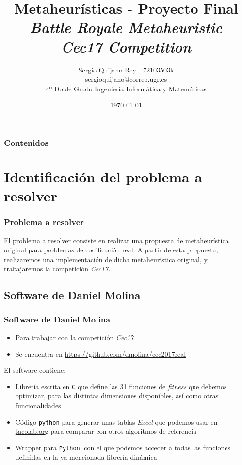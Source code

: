 \documentclass{beamer}
\title{
    {Metaheurísticas - Proyecto Final}\\
    {\emph{Battle Royale Metaheuristic}}\\
    {\emph{Cec17 Competition}}
}
\author{
    {Sergio Quijano Rey - 72103503k}\\
    {sergioquijano@correo.ugr.es} \\
    {4º Doble Grado Ingeniería Informática y Matemáticas}
}
\date{\today}
\begin{document}
\begin{frame}
    \titlepage
\end{frame}

\begin{frame}
    \frametitle{Contenidos}
    \tableofcontents
\end{frame}

\section{Identificación del problema a resolver}

\begin{frame}
\frametitle{Problema a resolver}

El problema a resolver consiste en realizar una propuesta de metaheurística original para problemas de codificación real. A partir de esta propuesta, realizaremos una implementación de dicha metaheurística original, y trabajaremos la competición \emph{Cec17}.

\end{frame}

\subsection{Software de Daniel Molina}
\begin{frame}
\frametitle{Software de Daniel Molina}
    \begin{itemize}
        \item Para trabajar con la competición \emph{Cec17}
        \item Se encuentra en \url{https://github.com/dmolina/cec2017real}
    \end{itemize}
\end{frame}

\begin{frame}
El software contiene:

\begin{itemize}
    \item Librería escrita en \lstinline{C} que define las 31 funciones de \emph{fitness} que debemos optimizar, para las distintas dimensiones disponibles, así como otras funcionalidades
    \item Código \lstinline{python} para generar unas tablas \emph{Excel} que podemos usar en \href{tacolab.org}{tacolab.org} para comparar con otros algoritmos de referencia
    \item Wrapper para \lstinline{Python}, con el que podemos acceder a todas las funciones definidas en la ya mencionada librería dinámica
\end{itemize}
\end{frame}
\end{document}
